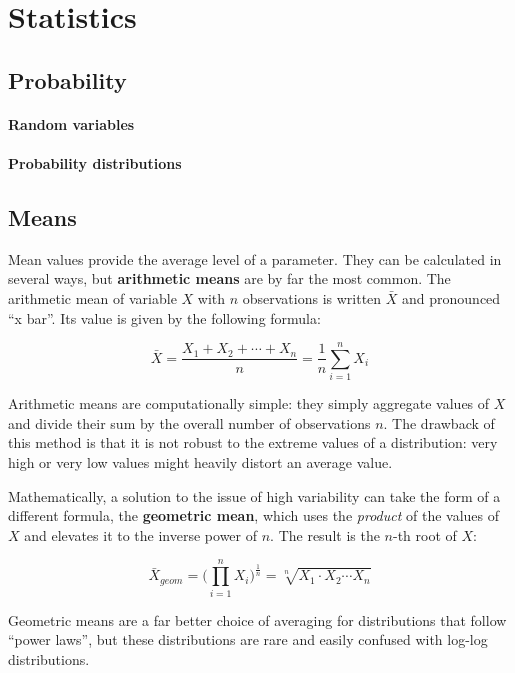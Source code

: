 \section{Statistics}

\subsection{Probability}

  \paragraph{Random variables}

  \paragraph{Probability distributions}

\subsection{Means}%

Mean values provide the average level of a parameter. They can be calculated in several ways, but \textbf{arithmetic means} are by far the most common. The arithmetic mean of variable $X$ with $n$ observations is written $\bar X$ and pronounced ``x bar''. Its value is given by the following formula:

$$\bar{X} = \frac{X_1 + X_2 + \cdots + X_n}{n} = \frac{1}{n}\sum_{i=1}^n X_i$$

Arithmetic means are computationally simple: they simply aggregate values of $X$ and divide their sum by the overall number of observations $n$. The drawback of this method is that it is not robust to the extreme values of a distribution: very high or very low values might heavily distort an average value.

Mathematically, a solution to the issue of high variability can take the form of a different formula, the \textbf{geometric mean}, which uses the \emph{product} of the values of $X$ and elevates it to the inverse power of $n$. The result is the $n$-th root of $X$:

$$\bar{X}_{geom}=\bigg(\prod_{i=1}^n X_i \bigg)^{\frac{1}{n}} = \sqrt[n]{X_1 \cdot X_2 \cdots X_n}$$

Geometric means are a far better choice of averaging for distributions that follow ``power laws'', but these distributions are rare and easily confused with log-log distributions.

